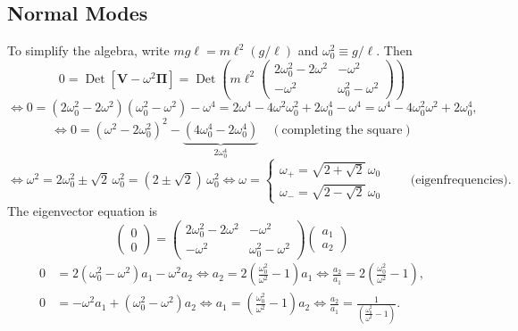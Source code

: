 \documentclass[11pt]{article}
\newcommand{\bV}{\mathbf{V}}
\newcommand{\bPi}{\bm{\Pi}}
\DeclareMathOperator{\Det}{Det}
\begin{document}
\subsection{Normal Modes}

To simplify the algebra, write $mg\ell = m\ell^2(g/\ell)$ and $\omega_0^2\equiv g/\ell$. Then
\begin{equation}
0 = \Det\left[\bV-\omega^2\bPi\right] = \Det\left(m\ell^2\begin{pmatrix}2\omega_0^2-2\omega^2 & -\omega^2\\ -\omega^2 & \omega_0^2-\omega^2\end{pmatrix}\right)
\end{equation}
\begin{equation}
\iff 0 = (2\omega_0^2-2\omega^2)(\omega_0^2-\omega^2)-\omega^4 = 2\omega^4-4\omega^2\omega_0^2+2\omega_0^4-\omega^4 = \omega^4-4\omega_0^2\omega^2+2\omega_0^4,
\end{equation}
\begin{equation}
\iff 0 = \left(\omega^2-2\omega_0^2\right)^2 - \underbrace{\left(4\omega_0^4-2\omega_0^4\right)}_{2\omega_0^4} \quad(\text{completing the square})
\end{equation}
\begin{equation}
\iff \omega^2 = 2\omega_0^2\pm\sqrt2\,\omega_0^2 = (2\pm\sqrt2)\,\omega_0^2 \iff
\boxed{\omega = \begin{cases}\omega_+=\sqrt{2+\sqrt2}\,\omega_0\\ \omega_-=\sqrt{2-\sqrt2}\,\omega_0\end{cases}} \qquad \text{(eigenfrequencies).}
\label{eq:dp-eigenfreq}
\end{equation}
The eigenvector equation is
\begin{equation}
\begin{pmatrix}0\\0\end{pmatrix} = \begin{pmatrix}2\omega_0^2-2\omega^2 & -\omega^2\\ -\omega^2 & \omega_0^2-\omega^2\end{pmatrix}\begin{pmatrix}a_1\\a_2\end{pmatrix}
\end{equation}
\begin{align}
0&=2(\omega_0^2-\omega^2)a_1-\omega^2 a_2 \iff a_2 = 2\left(\frac{\omega_0^2}{\omega^2}-1\right)a_1 \iff \frac{a_2}{a_1}=2\left(\frac{\omega_0^2}{\omega^2}-1\right),\\
0&=-\omega^2a_1+(\omega_0^2-\omega^2)a_2 \iff a_1 = \left(\frac{\omega_0^2}{\omega^2}-1\right)a_2 \iff \frac{a_2}{a_1}=\frac{1}{\left(\frac{\omega_0^2}{\omega^2}-1\right)}.
\end{align}
\end{document}
